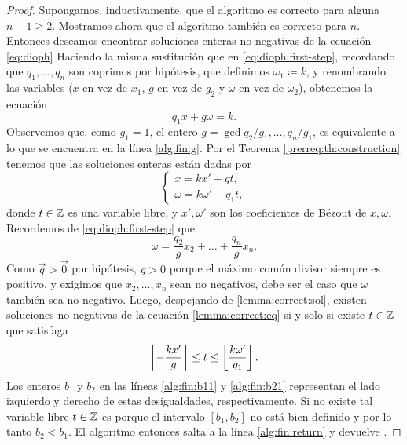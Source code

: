 \begin{proof}
	Supongamos, inductivamente, que el algoritmo es correcto para alguna $n - 1 \geq 2$. Mostramos
	ahora que el algoritmo también es correcto para $n$. Entonces deseamos encontrar soluciones
	enteras no negativas de la ecuación \eqref{eq:dioph} Haciendo la misma sustitución que en
	\eqref{eq:dioph:first-step}, recordando que $q_1, \ldots, q_n$ son coprimos por hipótesis, que
	definimos $\omega_1 \coloneq k$, y renombrando las variables ($x$ en vez de $x_1$, $g$ en vez de
	$g_2$ y $\omega$ en vez de $\omega_2$), obtenemos la ecuación
	\begin{equation}
		\label{lemma:correct:eq}
		q_1x + g\omega = k.
	\end{equation}
	Observemos que, como $g_1 = 1$, el entero $g = \gcd{q_2/g_1, \ldots, q_n/g_1}$, es equivalente a
	lo que se encuentra en la línea \ref{alg:fin:g}. Por el Teorema \ref{prerreq:th:construction}
	tenemos que las soluciones enteras están dadas por
	\begin{equation}
		\label{lemma:correct:sol}
		\begin{cases}
			x = kx' + gt, \\
			\omega = k\omega' - q_1t,
		\end{cases}
	\end{equation}
	donde $t \in \mathbb{Z}$ es una variable libre, y $x', \omega'$ son los coeficientes de Bézout de $x,
	\omega$. Recordemos de \eqref{eq:dioph:first-step} que
	\begin{equation}
		\label{lemma:correct:eq-omega}
		\omega = \frac{q_2}{g}x_2 + \ldots + \frac{q_n}{g}x_n.
	\end{equation}
	Como $\vec{q} > \vec{0}$ por hipótesis, $g > 0$ porque el máximo común divisor siempre es
	positivo, y exigimos que $x_2, \ldots, x_n$ sean no negativos, debe ser el caso que $\omega$
	también sea no negativo. Luego, despejando de \ref{lemma:correct:sol}, existen soluciones no
	negativas de la ecuación \eqref{lemma:correct:eq} si y solo si existe $t \in \mathbb{Z}$ que satisfaga
	\begin{equation*}
		\left\lceil -\frac{kx'}{g} \right\rceil \leq t \leq \left\lfloor \frac{k\omega'}{q_1} \right\rfloor.
	\end{equation*}
	Los enteros $b_1$ y $b_2$ en las líneas \eqref{alg:fin:b11} y \eqref{alg:fin:b21} representan el
	lado izquierdo y derecho de estas desigualdades, respectivamente. Si no existe tal variable
	libre $t \in \mathbb{Z}$ es porque el intervalo $[b_1, b_2]$ no está bien definido y por lo tanto $b_2 <
	b_1$. El algoritmo entonces salta a la línea \ref{alg:fin:return} y devuelve \NIL.


\end{proof}
